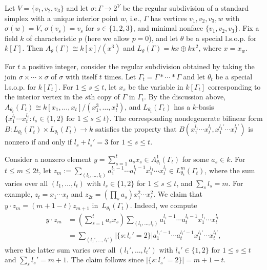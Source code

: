 \begin{example}\label{ex:counterexamples}
Let $V = \{ v_1, v_2 , v_3 \}$ and let $\sigma \colon \Gamma \to 2^V$ be 
the regular subdivision of a standard simplex with a unique interior point $w$, i.e., $\Gamma$ has vertices $v_1,v_2,v_3, w$ with $\sigma(w) = V$, $\sigma(v_s) = v_s$ for $s \in \{ 1,2,3\}$, and minimal nonface $\{ v_1, v_2, v_3 \}$. 
Fix a field $k$ of characteristic $p$ (here we allow $p = 0$), 
and let $\theta$ be a special l.s.o.p. for $k[\Gamma]$. 
Then $A_\theta(\Gamma) \cong k[x]/(x^3)$ and $L_\theta(\Gamma) = k x \oplus k x^2$, where $x = x_w$. 


For $t$ a positive integer, consider the regular subdivision obtained by taking the join $\sigma \times \cdots \times \sigma$ of $\sigma$ with itself $t$ times. Let $\Gamma_t = \Gamma * \cdots * \Gamma$ and let $\theta_t$ be a special l.s.o.p. for $k[\Gamma_t]$. 
For $1 \le s \le t$,  let $x_s$ be the variable in $k[\Gamma_t]$ corresponding to the interior vertex in the $s$th copy of $\Gamma$ in $\Gamma_t$.
By the discussion above,
$A_{\theta_t}(\Gamma_t) \cong k[x_1,\ldots,x_t]/(x_1^3,\ldots,x_t^3)$, and 
$L_{\theta_t}(\Gamma_t)$ has a $k$-basis \mbox{$\{ x_1^{l_1}\cdots x_t^{l_t} : l_s \in \{ 1,2 \} \textrm{ for } 1 \le s \le t \}$}. 
The corresponding nondegenerate bilinear form $B \colon L_{\theta_t}(\Gamma_t) \times L_{\theta_t}(\Gamma_t) \to k$ satisfies the property that
$B(x_1^{l_1}\cdots x_t^{l_t}, x_1^{l_1'}\cdots x_t^{l_t'})$ is nonzero if and only if $l_s + l_{s}' = 3$ for $1 \le s \le t$. 


Consider a nonzero element $y = \sum_{s = 1}^t a_s x_s \in A_{\theta_t}^1(\Gamma_t)$ for some $a_s \in k$. 
For \mbox{$t \le m \le 2t$}, let $z_m := \sum_{(l_1,\ldots,l_t)} a_1^{l_1 - 1}\cdots a_t^{l_t - 1} x_1^{l_1}\cdots x_t^{l_t} \in L^m_{\theta_t}(\Gamma_t)$, where the sum varies over all $(l_1,\ldots,l_t)$ with $l_s \in \{ 1,2 \}$ for $1 \le s \le t$, and $\sum_s l_s = m$. For example, $z_t = x_1 \cdots x_t$ and $z_{2t} = (\prod_s a_s) x_1^2 \cdots x_t^2$. We claim that $y \cdot z_m = (m + 1 - t) z_{m + 1}$ in~$L_{\theta_t}(\Gamma_t)$. Indeed, we compute 
\begin{align*}
	y \cdot z_m &= \left( \sum_{s = 1}^t a_s x_s \right) \sum_{(l_1,\ldots,l_t)} a_1^{l_1 - 1}\cdots a_t^{l_t - 1} x_1^{l_1}\cdots x_t^{l_t} \\
&= \sum_{(l_1',\ldots,l_t')} |\{ s : l_s' = 2 \}|	 a_1^{l_1' - 1}\cdots a_t^{l_t' - 1} x_1^{l_1'}\cdots x_t^{l_t'}, 
\end{align*}
where  the latter sum varies over all $(l_1',\ldots,l_t')$ with $l_s' \in \{ 1,2 \}$ for $1 \le s \le t$ and $\sum_s l_s' = m + 1$. The claim follows since $|\{ s : l_s' = 2 \}| = m + 1 - t$. 


\end{example}
